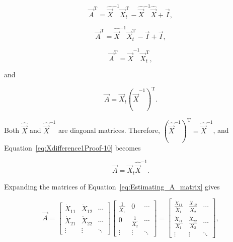 \begin{equation}\label{eq:Xdifference1Proof-7}
	\vec{A}^\mathrm{T} 
	= \hat{\vec{X}}^{-1} \vec{X}_{t}^\mathrm{T} 
	- \hat{\vec{X}}^{-1} \hat{\vec{X}}
	+ \vec{I},	
\end{equation}

\begin{equation}\label{eq:Xdifference1Proof-8}
	\vec{A}^\mathrm{T} 
	= \hat{\vec{X}}^{-1} \vec{X}_{t}^\mathrm{T} 
	- \vec{I}
	+ \vec{I},	
\end{equation}

\begin{equation}\label{eq:Xdifference1Proof-9}
	\vec{A}^\mathrm{T} 
	= \hat{\vec{X}}^{-1} 
	\vec{X}_{t}^\mathrm{T},
\end{equation}

\noindent{}and

\begin{equation}\label{eq:Xdifference1Proof-10}
	\vec{A} 
	= \vec{X}_{t}
	{\left( {\hat{\vec{X}}^{-1}} \right)}^\mathrm{T}.
\end{equation}

\noindent{}Both $\hat{\vec{X}}$ and $\hat{\vec{X}}^{-1}$
are diagonal matrices. Therefore, 
${\left( \hat{\vec{X}}^{-1} \right)}^{\mathrm{T}} = \hat{\vec{X}}^{-1}$, 
and Equation~\ref{eq:Xdifference1Proof-10} becomes

\begin{equation}\label{eq:Estimating_A_matrix} 
	\vec{A} 
	= \vec{X}_{t}
	\hat{\vec{X}}^{-1}.
\end{equation}

\noindent{}Expanding the matrices of Equation~\ref{eq:Estimating_A_matrix} gives

\begin{equation}
	\vec{A}
	=
	\begin{bmatrix}
		\dot{X}_{11} & \dot{X}_{12} & \cdots \\[0.65em]
		\dot{X}_{21} & \dot{X}_{22} & \cdots \\[0.35em]
		\vdots       & \vdots       & \ddots
	\end{bmatrix}
	\begin{bmatrix}
		\frac{1}{\dot{X}_{1}} & 0                     & \cdots \\[0.55em]
		0                     & \frac{1}{\dot{X}_{2}} & \cdots \\[0.25em]
		\vdots                & \vdots                & \ddots
	\end{bmatrix}
	=
	\begin{bmatrix}
		\frac{\dot{X}_{11}}{\dot{X}_{1}} & \frac{\dot{X}_{12}}{\dot{X}_{2}} & \cdots \\
		\frac{\dot{X}_{21}}{\dot{X}_{1}} & \frac{\dot{X}_{22}}{\dot{X}_{2}} & \cdots \\
		\vdots       & \vdots       & \ddots
	\end{bmatrix},
\end{equation}

